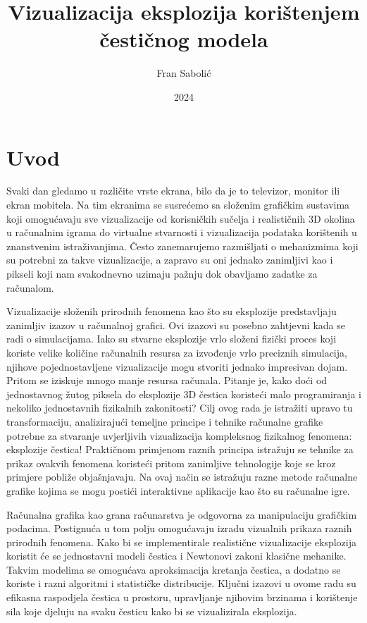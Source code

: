 \documentclass{foi}
\title{Vizualizacija eksplozija korištenjem čestičnog modela}
\author{Fran Sabolić}
\date{2024}
\begin{document}
\maketitle

\tableofcontents

\pagestyle{plain}
\chapter{Uvod}

Svaki dan gledamo u različite vrste ekrana, bilo da je to televizor, monitor ili ekran mobitela. Na tim ekranima se susrećemo sa složenim grafičkim sustavima koji omogućavaju sve vizualizacije od korisničkih sučelja i realističnih 3D okolina u računalnim igrama do virtualne stvarnosti i vizualizacija podataka korištenih u znanstvenim istraživanjima. Često zanemarujemo razmišljati o mehanizmima koji su potrebni za takve vizualizacije, a zapravo su oni jednako zanimljivi kao i pikseli koji nam svakodnevno uzimaju pažnju dok obavljamo zadatke za računalom.

Vizualizacije složenih prirodnih fenomena kao što su eksplozije predstavljaju zanimljiv izazov u računalnoj grafici. Ovi izazovi su posebno zahtjevni kada se radi o simulacijama. Iako su stvarne eksplozije vrlo složeni fizički proces koji koriste velike količine računalnih resursa za izvođenje vrlo preciznih simulacija, njihove pojednostavljene vizualizacije mogu stvoriti jednako impresivan dojam. Pritom se iziskuje mnogo manje resursa računala. Pitanje je, kako doći od jednostavnog žutog piksela do eksplozije 3D čestica koristeći malo programiranja i nekoliko jednostavnih fizikalnih zakonitosti? Cilj ovog rada je istražiti upravo tu transformaciju, analizirajući temeljne principe i tehnike računalne grafike potrebne za stvaranje uvjerljivih vizualizacija kompleksnog fizikalnog fenomena: eksplozije čestica! Praktičnom primjenom raznih principa istražuju se tehnike za prikaz ovakvih fenomena koristeći pritom zanimljive tehnologije koje se kroz primjere pobliže objašnjavaju. Na ovaj način se istražuju razne metode računalne grafike kojima se mogu postići interaktivne aplikacije kao što su računalne igre.

Računalna grafika kao grana računarstva je odgovorna za manipulaciju grafičkim podacima. Postignuća u tom polju omogućavaju izradu vizualnih prikaza raznih prirodnih fenomena. Kako bi se implementirale realistične vizualizacije eksplozija koristit će se jednostavni modeli čestica i Newtonovi zakoni klasične mehanike. Takvim modelima se omogućava aproksimacija kretanja čestica, a dodatno se koriste i razni algoritmi i statističke distribucije. Ključni izazovi u ovome radu su efikasna raspodjela čestica u prostoru, upravljanje njihovim brzinama i korištenje sila koje djeluju na svaku česticu kako bi se vizualizirala eksplozija.
\end{document}
